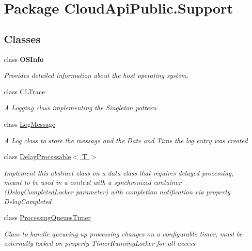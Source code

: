 \hypertarget{namespace_cloud_api_public_1_1_support}{\section{Package Cloud\-Api\-Public.\-Support}
\label{namespace_cloud_api_public_1_1_support}
}
\subsection*{Classes}
\begin{DoxyCompactItemize}
\item 
class {\bfseries O\-S\-Info}
\begin{DoxyCompactList}\small\item\em Provides detailed information about the host operating system. \end{DoxyCompactList}\item 
class \hyperlink{class_cloud_api_public_1_1_support_1_1_c_l_trace}{C\-L\-Trace}
\begin{DoxyCompactList}\small\item\em A Logging class implementing the Singleton pattern \end{DoxyCompactList}\item 
class \hyperlink{class_cloud_api_public_1_1_support_1_1_log_message}{Log\-Message}
\begin{DoxyCompactList}\small\item\em A Log class to store the message and the Date and Time the log entry was created \end{DoxyCompactList}\item 
class \hyperlink{class_cloud_api_public_1_1_support_1_1_delay_processable_3_01_t_01_4}{Delay\-Processable$<$ T $>$}
\begin{DoxyCompactList}\small\item\em Implement this abstract class on a data class that requires delayed processing, meant to be used in a context with a synchronized container (Delay\-Completed\-Locker parameter) with completion notification via property Delay\-Completed \end{DoxyCompactList}\item 
class \hyperlink{class_cloud_api_public_1_1_support_1_1_processing_queues_timer}{Processing\-Queues\-Timer}
\begin{DoxyCompactList}\small\item\em Class to handle queueing up processing changes on a configurable timer, must be externally locked on property Timer\-Running\-Locker for all access \end{DoxyCompactList}\end{DoxyCompactItemize}
